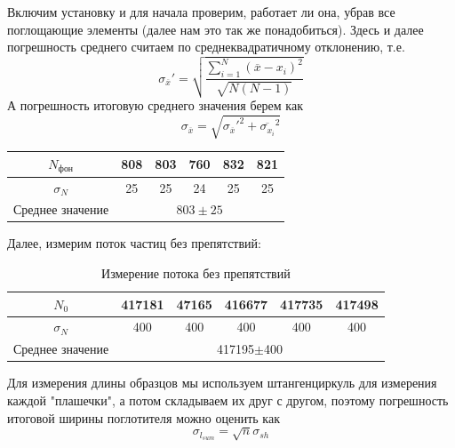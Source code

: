 \documentclass[a4paper,12pt]{extarticle}
\begin{document}
Включим установку и для начала проверим, работает ли она, убрав все поглощающие элементы (далее нам это так же понадобиться).
Здесь и далее погрешность среднего считаем по среднеквадратичному отклонению, т.е.
\[\sigma_{\overline{x}}' = \sqrt{\frac{\sum\limits_{i = 1}^N\left(\overline{x} - x_i\right)^2}{\sqrt{N(N-1)}}}\]
А погрешность итоговую среднего значения берем как 
\[\sigma_{\overline{x}} = \sqrt{\sigma_{\overline{x}}'^2+\overline{\sigma_{x_i}}^2}\]
\begin{table}[h!]
\begin{center}
\begin{tabular}{|c|c|c|c|c|c|}
\hline
$N_\text{фон}$& 808& 803 & 760& 832&821\\ \hline
$\sigma_N$& 25&  25& 24& 25&25\\ \hline
Среднее значение   & \multicolumn{5}{|c|}{$803\pm25$}\\ \hline
\end{tabular}
\end{center}
\end{table}

Далее, измерим поток частиц без препятствий:

\begin{table}[h!]
\begin{center}
\begin{tabular}{|c|c|c|c|c|c|}

\hline
$N_0$& 417181& 47165& 416677& 417735&417498\\ \hline
$\sigma_N$& 400& 400& 400& 400&400\\ \hline
Среднее значение   & \multicolumn{5}{|c|}{417195$\pm$400}\\ \hline
\end{tabular}
\caption{Измерение потока без препятствий}
\end{center}
\end{table}

Для измерения длины образцов мы используем штангенциркуль для измерения каждой "плашечки", а потом складываем их друг с другом, поэтому погрешность итоговой ширины поглотителя можно оценить как 
\[\sigma_{l_{sum}} = \sqrt{n}\sigma_{sh}\]
\end{document}
